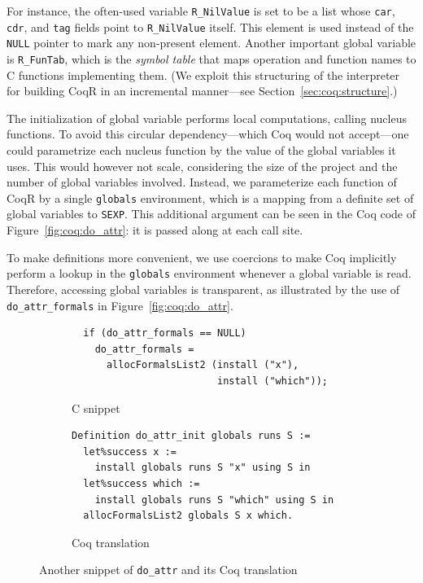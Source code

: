 \documentclass[
    sigplan,
    10pt,
    review, %
    natbib=false %
 ]{acmart}
\newcommand\CoqR{CoqR}
\begin{document}
For instance, the often-used variable \texttt{R_NilValue}
is set to be a list whose \texttt{car}, \texttt{cdr},
and \texttt{tag} fields point to \texttt{R_NilValue} itself.
This element is used instead of the \texttt{NULL} pointer
to mark any non-present element. Another important global variable is
\texttt{R_FunTab}, which is the {\em symbol table} that maps operation and function names to C functions implementing them. (We exploit this structuring of the interpreter for building \CoqR{} in an incremental manner---see Section~\ref{sec:coq:structure}.)

%
The initialization of global variable performs local computations, calling nucleus functions.
To avoid this circular dependency---which Coq would not accept---one could parametrize each nucleus function by the value of the global variables it uses.
This would however not scale, considering the size of the project and the number of global variables involved.
%
Instead, we parameterize each function of \CoqR{} by a single \texttt{globals} environment, which is a mapping from a definite set of global variables to \texttt{SEXP}. This additional argument can be seen in the Coq code of Figure~\ref{fig:coq:do_attr}: it is passed along at each call site.

To make definitions more convenient, we use coercions to make Coq implicitly perform a lookup in the \texttt{globals} environment whenever a global variable is read. Therefore, accessing global variables is transparent, as illustrated by the use of \texttt{do_attr_formals} in Figure~\ref{fig:coq:do_attr}.


\begin{figure}
    \centering{}
\begin{subfigure}{.5\textwidth}
\begin{verbatim}
  if (do_attr_formals == NULL)
    do_attr_formals =
      allocFormalsList2 (install ("x"),
                         install ("which"));
\end{verbatim}
    \caption{C snippet}
    \label{fig:c:do_attr:formals}
\end{subfigure}
\begin{subfigure}{.49\textwidth}
\begin{verbatim}
Definition do_attr_init globals runs S :=
  let%success x :=
    install globals runs S "x" using S in
  let%success which :=
    install globals runs S "which" using S in
  allocFormalsList2 globals S x which.
\end{verbatim}
    \caption{Coq translation}
    \label{fig:coq:do_attr:formals}
\end{subfigure}
\vspace{-1em}
    \caption{Another snippet of \texttt{do_attr} and its Coq translation}
    \label{fig:do_attr:formals}
\end{figure}
\end{document}
